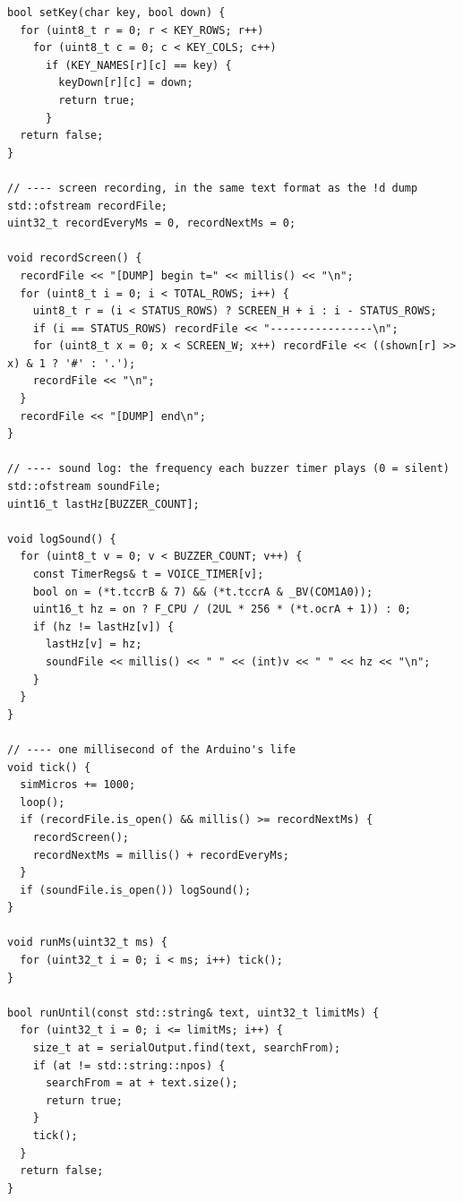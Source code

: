 \documentclass[11pt,a4paper]{article}
\begin{document}
\begin{lstlisting}[language=Arduino]
bool setKey(char key, bool down) {
  for (uint8_t r = 0; r < KEY_ROWS; r++)
    for (uint8_t c = 0; c < KEY_COLS; c++)
      if (KEY_NAMES[r][c] == key) {
        keyDown[r][c] = down;
        return true;
      }
  return false;
}

// ---- screen recording, in the same text format as the !d dump
std::ofstream recordFile;
uint32_t recordEveryMs = 0, recordNextMs = 0;

void recordScreen() {
  recordFile << "[DUMP] begin t=" << millis() << "\n";
  for (uint8_t i = 0; i < TOTAL_ROWS; i++) {
    uint8_t r = (i < STATUS_ROWS) ? SCREEN_H + i : i - STATUS_ROWS;
    if (i == STATUS_ROWS) recordFile << "----------------\n";
    for (uint8_t x = 0; x < SCREEN_W; x++) recordFile << ((shown[r] >> x) & 1 ? '#' : '.');
    recordFile << "\n";
  }
  recordFile << "[DUMP] end\n";
}

// ---- sound log: the frequency each buzzer timer plays (0 = silent)
std::ofstream soundFile;
uint16_t lastHz[BUZZER_COUNT];

void logSound() {
  for (uint8_t v = 0; v < BUZZER_COUNT; v++) {
    const TimerRegs& t = VOICE_TIMER[v];
    bool on = (*t.tccrB & 7) && (*t.tccrA & _BV(COM1A0));
    uint16_t hz = on ? F_CPU / (2UL * 256 * (*t.ocrA + 1)) : 0;
    if (hz != lastHz[v]) {
      lastHz[v] = hz;
      soundFile << millis() << " " << (int)v << " " << hz << "\n";
    }
  }
}

// ---- one millisecond of the Arduino's life
void tick() {
  simMicros += 1000;
  loop();
  if (recordFile.is_open() && millis() >= recordNextMs) {
    recordScreen();
    recordNextMs = millis() + recordEveryMs;
  }
  if (soundFile.is_open()) logSound();
}

void runMs(uint32_t ms) {
  for (uint32_t i = 0; i < ms; i++) tick();
}

bool runUntil(const std::string& text, uint32_t limitMs) {
  for (uint32_t i = 0; i <= limitMs; i++) {
    size_t at = serialOutput.find(text, searchFrom);
    if (at != std::string::npos) {
      searchFrom = at + text.size();
      return true;
    }
    tick();
  }
  return false;
}


\end{lstlisting}
\end{document}
